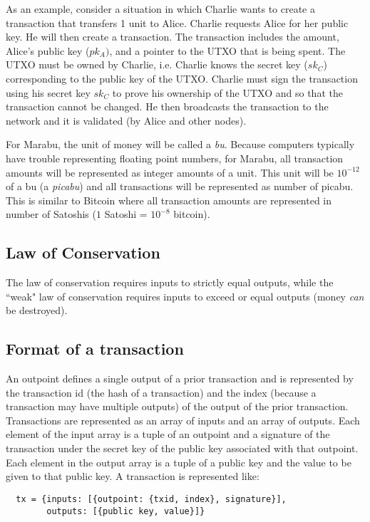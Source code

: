As an example, consider a situation in which Charlie wants to create a transaction that transfers 1 unit to Alice. Charlie requests Alice for her public key. He will then create a transaction. The transaction includes the amount, Alice's public key ($pk_{A})$, and a pointer to the UTXO that is being spent. The UTXO must be owned by Charlie, i.e. Charlie knows the secret key ($sk_{C}$) corresponding to the public key of the UTXO. Charlie must sign the transaction using his secret key $sk_{C}$ to prove his ownership of the UTXO and so that the transaction cannot be changed. He then broadcasts the transaction to the network and it is validated (by Alice and other nodes).

For Marabu, the unit of money will be called a \emph{bu}. Because computers typically have trouble representing floating point numbers, for Marabu, all transaction amounts will be represented as integer amounts of a unit. This unit will be $10^{-12}$ of a bu (a \emph{picabu}) and all transactions will be represented as number of picabu.
This is similar to Bitcoin where all transaction amounts are represented in number of Satoshis ($1$ Satoshi = $10^{-8}$ bitcoin).

\subsection{Law of Conservation}

The law of conservation requires inputs to strictly equal outputs, while the ``weak" law of conservation requires inputs to exceed or equal outputs (money \emph{can} be destroyed).

\subsection{Format of a transaction}
An outpoint defines a single output of a prior transaction and is represented by the transaction id (the hash of a transaction) and the index (because a transaction may have multiple outputs) of the output of the prior transaction. Transactions are represented as an array of inputs and an array of outputs. Each element of the input array is a tuple of an outpoint and a signature of the transaction under the secret key of the public key associated with that outpoint. Each element in the output array is a tuple of a public key and the value to be given to that public key. A transaction is represented like:

\begin{verbatim}
  tx = {inputs: [{outpoint: {txid, index}, signature}],
        outputs: [{public key, value}]}
 \end{verbatim}

